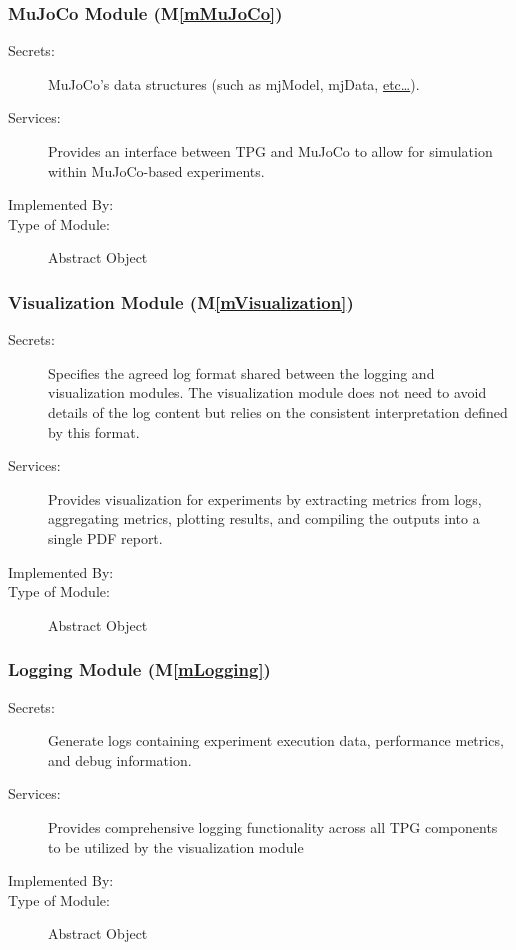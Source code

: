 \documentclass[12pt, titlepage]{article}
\newcommand{\mref}[1]{M\ref{#1}}
\begin{document}
\subsubsection{MuJoCo Module (\mref{mMuJoCo})}

\begin{description}
\item[Secrets:]MuJoCo's data structures (such as mjModel, mjData, \href{https://mujoco.readthedocs.io/en/stable/APIreference/APItypes.html#struct-types}{etc…}).
\item[Services:]Provides an interface between TPG and MuJoCo to allow for simulation within MuJoCo-based experiments.
\item[Implemented By:] \progname{}
\item[Type of Module:] Abstract Object
\end{description}

\subsubsection{Visualization Module (\mref{mVisualization})}

\begin{description}
\item[Secrets:] Specifies the agreed log format shared between the logging and visualization modules. The visualization module does not need to avoid details of the log content but relies on the consistent interpretation defined by this format.
\item[Services:] Provides visualization for experiments by extracting metrics from logs, aggregating metrics, plotting results, and compiling the outputs into a single PDF report.
\item[Implemented By:] \progname{}
\item[Type of Module:] Abstract Object
\end{description}

\subsubsection{Logging Module  (\mref{mLogging})}

\begin{description}
\item[Secrets:] Generate logs containing experiment execution data, performance metrics, and debug information.
\item[Services:] Provides comprehensive logging functionality across all TPG components to be utilized by the visualization module
\item[Implemented By:] \progname{}
\item[Type of Module:] Abstract Object
\end{description}
\end{document}
